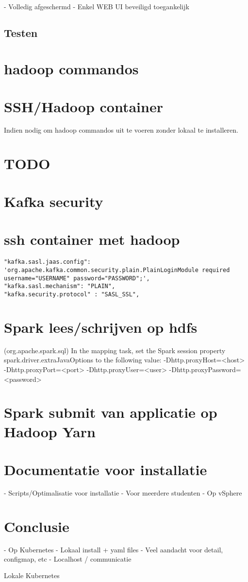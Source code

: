 - Volledig afgeschermd
- Enkel WEB UI beveiligd toegankelijk

\subsection{Testen}

\section{hadoop commandos}

\section{SSH/Hadoop container}

Indien nodig om hadoop commandos uit te voeren zonder lokaal te installeren.

\section{TODO}

\section{Kafka security}

\section{ssh container met hadoop}
\begin{lstlisting}
"kafka.sasl.jaas.config": 'org.apache.kafka.common.security.plain.PlainLoginModule required username="USERNAME" password="PASSWORD";',
"kafka.sasl.mechanism": "PLAIN",
"kafka.security.protocol" : "SASL_SSL",
\end{lstlisting}
\section{Spark lees/schrijven op hdfs}
 (org.apache.spark.sql)
In the mapping task, set the Spark session property spark.driver.extraJavaOptions to the following value: -Dhttp.proxyHost=<host> -Dhttp.proxyPort=<port> -Dhttp.proxyUser=<user> -Dhttp.proxyPassword=<password>

\section{Spark submit van applicatie op Hadoop Yarn}

\section{Documentatie voor installatie}

- Scripts/Optimalisatie voor installatie
- Voor meerdere studenten
- Op vSphere

\section{Conclusie}

- Op Kubernetes
- Lokaal install + yaml files
- Veel aandacht voor detail, configmap, etc
- Localhost / communicatie

Lokale Kubernetes